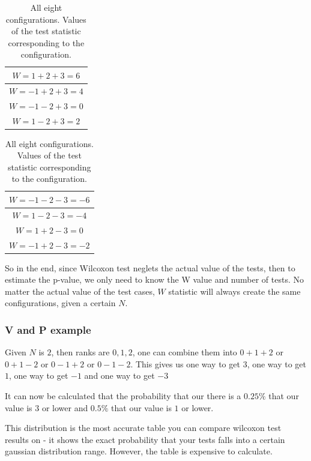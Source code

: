 \documentclass[12pt]{article}
\begin{document}
\begin{table}[!ht]
  \begin{center}
      \begin{tabular}{c}
      \hline
      $W = 1 + 2 + 3 = 6$ \\
      \hline
      $W = -1 + 2 + 3 = 4$\\
      \hline
      $W = -1 - 2 + 3 = 0$\\
      \hline
      $W = 1 - 2 + 3 = 2$\\
      \hline
      \end{tabular}
      \begin{tabular}{c}
      \hline
      $W = -1 - 2 - 3 = -6$\\
      \hline
      $W = 1 - 2 - 3 = -4$\\
      \hline
      $W = 1 + 2 - 3 = 0$\\
      \hline
      $W = -1 + 2 - 3 = -2$\\
      \hline
      \end{tabular}
    \caption{All eight configurations. Values of the test statistic corresponding to the configuration.}
    \label{table:adding_w_results}
  \end{center}
\end{table}

So in the end, since Wilcoxon test neglets the actual value of the tests, then to estimate the p-value, we only need to know the W value and number of tests. No matter the actual value of the test cases, $W$ statistic will always create the same configurations, given a certain $N$.

\subsubsection{V and P example}

Given $N$ is $2$, then ranks are ${0, 1, 2}$, one can combine them into $0 + 1 + 2$ or $0 + 1 - 2$ or $0 - 1 + 2$ or $0 - 1 - 2$. This gives us one way to get $3$, one way to get $1$, one way to get $-1$ and one way to get $-3$

It can now be calculated that the probability that our there is a $0.25\%$ that our value is $3$ or lower and $0.5\%$ that our value is $1$ or lower.

This distribution is the most accurate table you can compare wilcoxon test results on - it shows the exact probability that your tests falls into a certain gaussian distribution range. However, the table is expensive to calculate.
\end{document}
